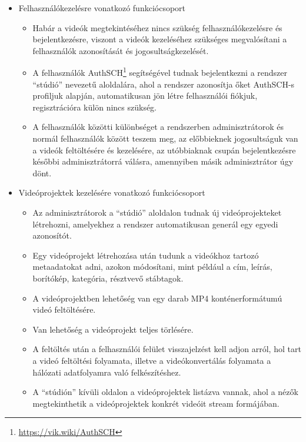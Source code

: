 \begin{itemize}
  \item Felhasználókezelésre vonatkozó funkciócsoport
        \begin{itemize}
          \item Habár a videók megtekintéséhez nincs szükség felhasználókezelésre és bejelentkezésre, viszont a videók kezeléséhez szükséges megvalósítani a felhasználók azonosítását és jogosultságkezelését.
          \item A felhasználók AuthSCH\footnote{\url{https://vik.wiki/AuthSCH}} segítségével tudnak bejelentkezni a rendszer ``stúdió'' nevezetű aloldalára, ahol a rendszer azonosítja őket AuthSCH-s profiljuk alapján, automatikusan jön létre felhasználói fiókjuk, regisztrációra külön nincs szükség.
          \item A felhasználók közötti különbséget a rendszerben adminisztrátorok és normál felhasználók között teszem meg, az előbbieknek jogosultságuk van a videók feltöltésére és kezelésére, az utóbbiaknak csupán bejelentkezésre későbbi adminisztrátorrá válásra, amennyiben másik adminisztrátor úgy dönt.
        \end{itemize}

  \item Videóprojektek kezelésére vonatkozó funkciócsoport
        \begin{itemize}
          \item Az adminisztrátorok a ``stúdió'' aloldalon tudnak új videóprojekteket létrehozni, amelyekhez a rendszer automatikusan generál egy egyedi azonosítót.
          \item Egy videóprojekt létrehozása után tudunk a videókhoz tartozó metaadatokat adni, azokon módosítani, mint például a cím, leírás, borítókép, kategória, résztvevő stábtagok.
          \item A videóprojektben lehetőség van egy darab MP4 konténerformátumú videó feltöltésére.
          \item Van lehetőség a videóprojekt teljes törlésére.
          \item A feltöltés után a felhasználói felület visszajelzést kell adjon arról, hol tart a videó feltöltési folyamata, illetve a videókonvertálás folyamata a hálózati adatfolyamra való felkészítéshez.
          \item A ``stúdión'' kívüli oldalon a videóprojektek listázva vannak, ahol a nézők megtekinthetik a videóprojektek konkrét videóit stream formájában.
        \end{itemize}


\end{itemize}
